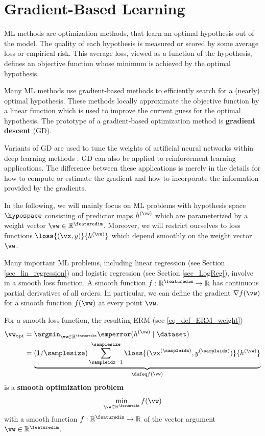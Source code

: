 \documentclass[12pt]{report}
\begin{document}
\newpage
\chapter{Gradient-Based Learning}
\label{ch_GD}

ML methods are optimization methods, that learn an optimal 
hypothesis out of the model. The quality of each hypothesis is 
measured or scored by some average loss or empirical risk. This
average loss, viewed as a function of the hypothesis, defines 
an objective function whose minimum is achieved by the 
optimal hypothesis. 

Many ML methods use gradient-based methods to efficiently search 
for a (nearly) optimal hypothesis. These methods locally 
approximate the objective function by a linear function which 
is used to improve the current guess for the optimal hypothesis. 
The prototype of a gradient-based optimization method is {\bf gradient descent} (GD). 

Variants of GD are used to tune the weights of artificial neural 
networks within deep learning methods \cite{Goodfellow-et-al-2016}. 
GD can also be applied to reinforcement learning applications. The 
difference between these applications is merely in the details for 
how to compute or estimate the gradient and how to incorporate 
the information provided by the gradients. 

In the following, we will mainly focus on ML problems with hypothesis 
space $\hypospace$ consisting of predictor maps $h^{(\vw)}$ 
which are parameterized by a weight vector $\vw \in \mathbb{R}^{\featuredim}$. 
Moreover, we will restrict ourselves to loss functions $\loss{(\vx,y)}{h^{(\vw)}}$ 
which depend smoothly on the weight vector $\vw$. 

Many important ML problems, including linear regression (see Section \ref{sec_lin_regression}) 
and logistic regression (see Section \ref{sec_LogReg}), involve in a smooth loss 
function. A smooth function $f: \mathbb{R}^{\featuredim} \rightarrow \mathbb{R}$ 
has continuous partial derivatives of all orders. In particular, we can define the 
gradient $\nabla f(\vw)$ for a smooth function $f(\vw)$ at every point $\vw$.

For a smooth loss function, the resulting ERM (see \eqref{eq_def_ERM_weight})  
\begin{align}
\label{equ_def_ERM_continous}
\vw_{\rm opt} & = \argmin_{\vw \in \mathbb{R}^{\featuredim}}  \emperror( h^{(\vw)} \mid \dataset)  \nonumber \\
& = \underbrace{(1/\samplesize) \sum_{\sampleidx=1}^{\samplesize} \loss{(\vx^{(\sampleidx)},y^{(\sampleidx)})}{h^{(\vw)}}}_{\defeq f(\vw)} 
\end{align} 
is a {\bf smooth optimization problem}
\begin{equation}
\label{equ_generic_smooth_problem}
\min_{\vw \in \mathbb{R}^{\featuredim}} f(\vw)
\end{equation} 
with a smooth function $f: \mathbb{R}^{\featuredim} \rightarrow \mathbb{R}$ of 
the vector argument $\vw \in \mathbb{R}^{\featuredim}$. 
\end{document}
